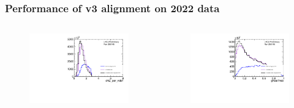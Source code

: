 \documentclass[aspectratio=1610, 12pt, xcolor=dvipsnames]{beamer}
\begin{document}
\begin{frame}\frametitle{Performance of v3 alignment on 2022 data}
  \begin{columns}
    \begin{column}[c]{0.49\textwidth}
      \begin{figure}
        \includegraphics[width=\textwidth]{plots/chi2_moore.pdf}
      \end{figure}
    \end{column}
    \begin{column}[c]{0.49\textwidth}
      \begin{figure}
        \includegraphics[width=\textwidth]{plots/ghost_moore.pdf}
      \end{figure}
    \end{column}
  \end{columns}  
\end{frame}
\end{document}
